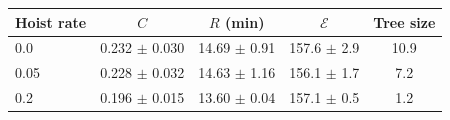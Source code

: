 \begin{tabular}{lcccc}\toprule
Hoist rate & $C$ & $R$ (min) & $\mathcal{E}$ & Tree size\\\midrule
0.0 & 0.232 $\pm$ 0.030 & 14.69 $\pm$ 0.91 & 157.6 $\pm$ 2.9 & 10.9\\
0.05 & 0.228 $\pm$ 0.032 & 14.63 $\pm$ 1.16 & 156.1 $\pm$ 1.7 & 7.2\\
0.2 & 0.196 $\pm$ 0.015 & 13.60 $\pm$ 0.04 & 157.1 $\pm$ 0.5 & 1.2\\
\bottomrule
\end{tabular}